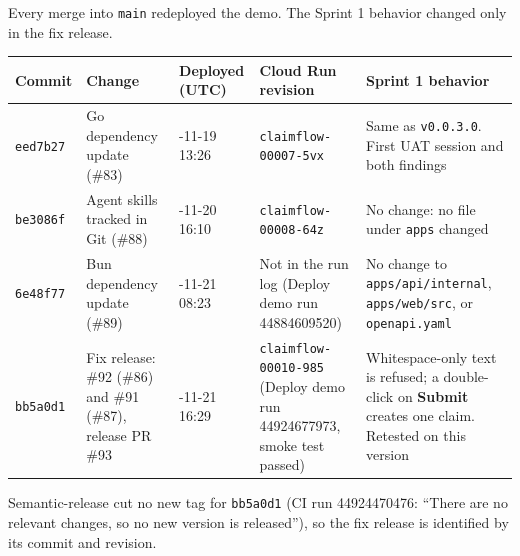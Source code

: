 
Every merge into \texttt{main} redeployed the demo. The Sprint 1 behavior changed only in the fix release.

{\def\LTcaptype{none} %
\begin{longtable}[]{@{}
  >{\raggedright\arraybackslash}p{}
  >{\raggedright\arraybackslash}p{}
  >{\raggedright\arraybackslash}p{}
  >{\raggedright\arraybackslash}p{}
  >{\raggedright\arraybackslash}p{}@{}}
\toprule\noalign{}
\begin{minipage}[b]{\linewidth}\raggedright
Commit
\end{minipage} & \begin{minipage}[b]{\linewidth}\raggedright
Change
\end{minipage} & \begin{minipage}[b]{\linewidth}\raggedright
Deployed (UTC)
\end{minipage} & \begin{minipage}[b]{\linewidth}\raggedright
Cloud Run revision
\end{minipage} & \begin{minipage}[b]{\linewidth}\raggedright
Sprint 1 behavior
\end{minipage} \\
\midrule\noalign{}
\endhead
\bottomrule\noalign{}
\endlastfoot
\texttt{eed7b27} & Go dependency update (\#83) & 2026-11-19 13:26 & \texttt{claimflow-00007-5vx} & Same as \texttt{v0.0.3.0}. First UAT session and both findings \\
\texttt{be3086f} & Agent skills tracked in Git (\#88) & 2026-11-20 16:10 & \texttt{claimflow-00008-64z} & No change: no file under \texttt{apps} changed \\
\texttt{6e48f77} & Bun dependency update (\#89) & 2026-11-21 08:23 & Not in the run log (Deploy demo run 44884609520) & No change to \texttt{apps/api/internal}, \texttt{apps/web/src}, or \texttt{openapi.yaml} \\
\texttt{bb5a0d1} & Fix release: \#92 (\#86) and \#91 (\#87), release PR \#93 & 2026-11-21 16:29 & \texttt{claimflow-00010-985} (Deploy demo run 44924677973, smoke test passed) & Whitespace-only text is refused; a double-click on \textbf{Submit} creates one claim. Retested on this version \\
\end{longtable}
}

Semantic-release cut no new tag for \texttt{bb5a0d1} (CI run 44924470476: ``There are no relevant changes, so no new version is released''), so the fix release is identified by its commit and revision.

